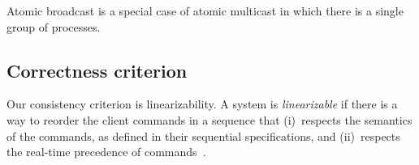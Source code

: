 Atomic broadcast is a special case of atomic multicast in which there
is a single group of processes.

\subsection{Correctness criterion}
\label{sec:correctcrit}

Our consistency criterion is linearizability.  A system is
\emph{linearizable} if there is a way to reorder the client commands
in a sequence that (i)~respects the semantics of the commands, as
defined in their sequential specifications, and (ii)~respects the
real-time precedence of commands~\cite{Attiya04}.


